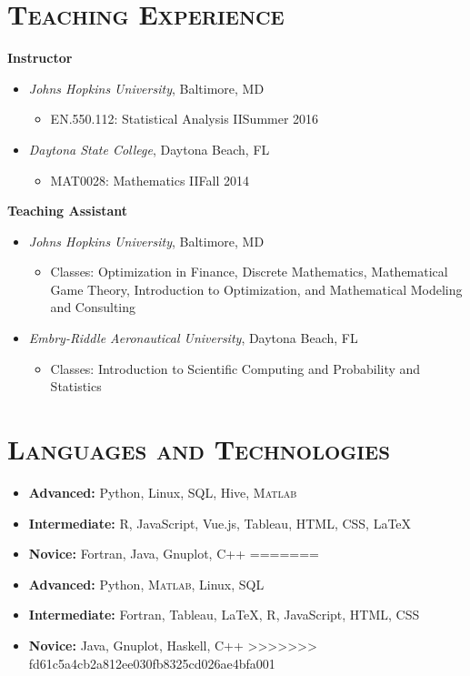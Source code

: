 \documentclass[10pt]{article}
\begin{document}
\section*{\textsc{Teaching Experience}}
\textbf{Instructor}
\begin{itemize}[noitemsep]
    \item[] \textit{Johns Hopkins University}, Baltimore, MD
    \begin{itemize}[noitemsep]
        \item EN.550.112: Statistical Analysis II\hfill Summer 2016
    \end{itemize}
    \vspace{1ex}
    \item[] \textit{Daytona State College}, Daytona Beach, FL
    \begin{itemize}[noitemsep]
        \item MAT0028: Mathematics II\hfill Fall 2014
    \end{itemize}
\end{itemize}
\textbf{Teaching Assistant}
\begin{itemize}[noitemsep]
    \item[] \textit{Johns Hopkins University}, Baltimore, MD
    \begin{itemize}[noitemsep]
        \item[] Classes: Optimization in Finance, Discrete Mathematics, Mathematical Game Theory, Introduction to Optimization, and Mathematical Modeling and Consulting
    \end{itemize}
    \vspace{1ex}
    \item[] \textit{Embry-Riddle Aeronautical University}, Daytona Beach, FL
    \begin{itemize}[noitemsep]
        \item[] Classes: Introduction to Scientific Computing and Probability and Statistics
    \end{itemize}
\end{itemize}

\section*{\textsc{Languages and Technologies}}
\begin{itemize}
<<<<<<< HEAD
    \item[] \textbf{Advanced:} Python, Linux, SQL, Hive, \textsc{Matlab}
    \item[] \textbf{Intermediate:} \textsc{R}, JavaScript, Vue.js, Tableau, HTML, CSS, \LaTeX{}
    \item[] \textbf{Novice:} Fortran, Java, Gnuplot, \textsc{C++}
=======
    \item[] \textbf{Advanced:} Python, \textsc{Matlab}, Linux, SQL
    \item[] \textbf{Intermediate:} Fortran, Tableau, \LaTeX{}, \textsc{R}, JavaScript, HTML, CSS
    \item[] \textbf{Novice:} Java, Gnuplot, Haskell, \textsc{C++}
>>>>>>> fd61c5a4cb2a812ee030fb8325cd026ae4bfa001
\end{itemize}
\end{document}
